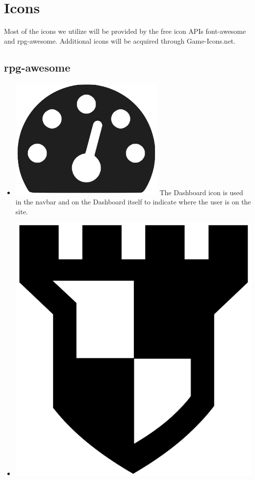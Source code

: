 \documentclass[12pt,a4paper]{report}
\begin{document}
	\section{Icons}
	Most of the icons we utilize will be provided by the free icon APIs font-awesome\cite{font-awesome} and rpg-awesome\cite{rpg-awesome}. Additional icons will be acquired through Game-Icons.net.
	\subsection{rpg-awesome}
	\begin{itemize}
		\item \includegraphics[scale=.06]{dashboard_icon}
		The Dashboard icon is used in the navbar and on the Dashboard itself to indicate where the user is on the site.
		\item \includegraphics[scale=.03]{arena_icon}

\end{itemize}
\end{document}
